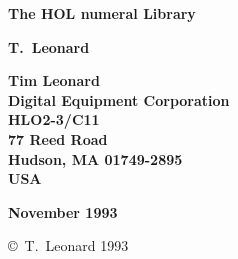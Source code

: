 
\begin{titlepage}

\setcounter{page}{1}                      %


\mbox{}
\vskip20mm
\begin{center}
{\Huge\bf The HOL numeral Library}
\end{center}


\vskip15mm
\begin{center}
\large\bf T.\ Leonard
\end{center}


\vfill
\begin{center}
\bf
Tim Leonard\\
Digital Equipment Corporation\\
HLO2-3/C11\\
77 Reed Road\\
Hudson, MA 01749-2895\\
USA\\
\end{center}


\vskip5mm
\begin{center}
\bf November 1993
\end{center}

\end{titlepage}

\thispagestyle{empty}
\mbox{}

\vfill
\begin{center}
\copyright\ T.\ Leonard 1993
\end{center}
\newpage
